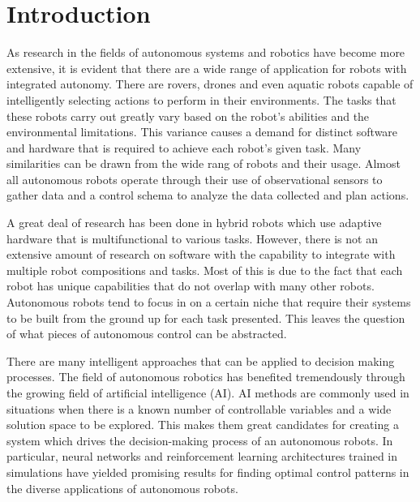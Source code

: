 

\chapter{Introduction}
As research in the fields of autonomous systems and robotics have become more extensive, it is evident that there are a wide range of application for robots with integrated autonomy.
There are rovers, drones and even aquatic robots capable of intelligently selecting actions to perform in their environments.
The tasks that these robots carry out greatly vary based on the robot's abilities and the environmental limitations.
This variance causes a demand for distinct software and hardware that is required to achieve each robot's given task.
Many similarities can be drawn from the wide rang of robots and their usage.
Almost all autonomous robots operate through their use of observational sensors to gather data and a control schema to analyze the data collected and plan actions.

A great deal of research has been done in hybrid robots which use adaptive hardware that is multifunctional to various tasks.
However, there is not an extensive amount of research on software with the capability to integrate with multiple robot compositions and tasks.
Most of this is due to the fact that each robot has unique capabilities that do not overlap with many other robots.
Autonomous robots tend to focus in on a certain niche that require their systems to be built from the ground up for each task presented.
This leaves the question of what pieces of autonomous control can be abstracted.

There are many intelligent approaches that can be applied to decision making processes.
The field of autonomous robotics has benefited tremendously through the growing field of artificial intelligence (AI).
AI methods are commonly used in situations when there is a known number of controllable variables and a wide solution space to be explored.
This makes them great candidates for creating a system which drives the decision-making process of an autonomous robots.
In particular, neural networks and reinforcement learning architectures trained in simulations have yielded promising results for finding optimal control patterns in the diverse applications of autonomous robots.

